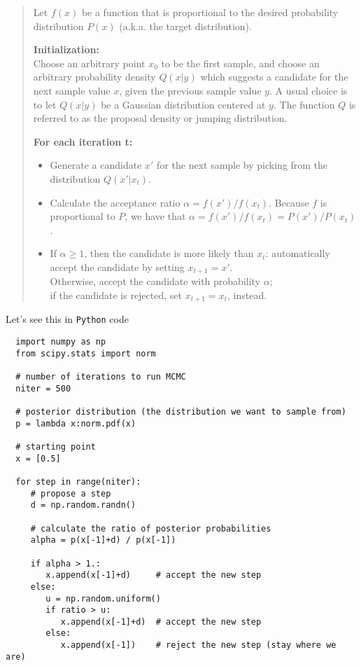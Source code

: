 \documentclass[a4paper,11pt]{article}
\begin{document}
\begin{quote}
   Let $f(x)$ be a function that is proportional to the desired probability distribution $P(x)$ (a.k.a. the target distribution).

    \textbf{Initialization:}\\
    Choose an arbitrary point $x_0$ to be the first sample, and choose an arbitrary probability density $Q(x|y)$ which suggests a candidate for the next sample value $x$, given the previous sample value $y$. A usual choice is to let $Q(x|y)$ be a Gaussian distribution centered at $y$. The function $Q$ is referred to as the proposal density or jumping distribution.

    \textbf{For each iteration t:}
    \begin{itemize}
      \item Generate a candidate $x'$ for the next sample by picking from the distribution $Q(x'|x_t)$.
      \item Calculate the acceptance ratio $\alpha = f(x')/f(x_t)$. Because $f$ is proportional to $P$, we have that $\alpha = f(x')/f(x_t) = P(x')/P(x_t)$.
      \item If $\alpha \geq 1$, then the candidate is more likely than $x_t$: automatically accept the candidate by setting $x_{t+1} = x'$. \\
      Otherwise, accept the candidate with probability $\alpha$;\\
      if the candidate is rejected, set $x_{t+1} = x_t$, instead.
\end{itemize}
\end{quote}

Let's see this in \texttt{Python} code


\begin{verbatim}
  import numpy as np
  from scipy.stats import norm
  
  # number of iterations to run MCMC
  niter = 500
  
  # posterior distribution (the distribution we want to sample from)
  p = lambda x:norm.pdf(x)
  
  # starting point
  x = [0.5]
  
  for step in range(niter):
     # propose a step
     d = np.random.randn()
     
     # calculate the ratio of posterior probabilities
     alpha = p(x[-1]+d) / p(x[-1])
  
     if alpha > 1.:
        x.append(x[-1]+d)     # accept the new step
     else:
        u = np.random.uniform()
        if ratio > u:
           x.append(x[-1]+d)  # accept the new step
        else:
           x.append(x[-1])    # reject the new step (stay where we are)
\end{verbatim}
\end{document}
